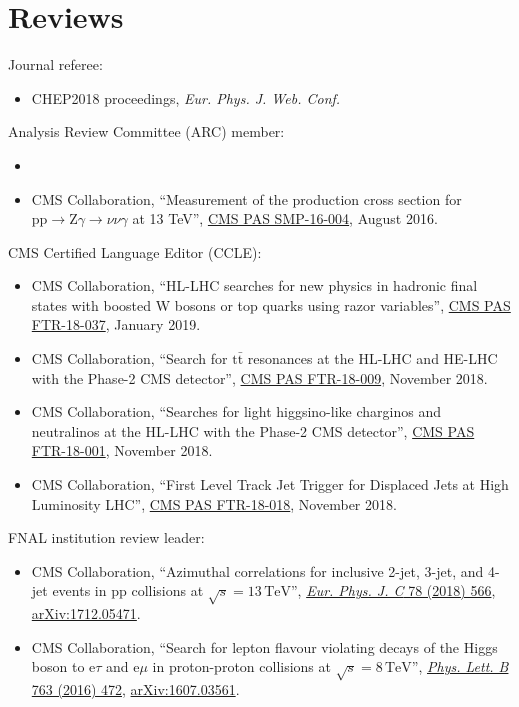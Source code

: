 \section{Reviews}
Journal referee:
\begin{itemize}[leftmargin=12pt]
\item CHEP2018 proceedings, \emph{Eur. Phys. J. Web. Conf.}
\end{itemize}
Analysis Review Committee (ARC) member:
\begin{itemize}[leftmargin=12pt]
\item {}
\item CMS Collaboration, ``Measurement of the production cross section for $\text{p}\text{p} \to \text{Z}\gamma \to \nu\nu\gamma$ at 13 TeV'', \href{https://cds.cern.ch/record/2204922}{CMS PAS SMP-16-004}, August 2016.
\end{itemize}
CMS Certified Language Editor (CCLE):
\begin{itemize}[leftmargin=12pt]
\item CMS Collaboration, ``HL-LHC searches for new physics in hadronic final states with boosted W bosons or top quarks using razor variables'', \href{https://cds.cern.ch/record/2658262}{CMS PAS FTR-18-037}, January 2019.
\item CMS Collaboration, ``Search for $\text{t}\bar{\text{t}}$ resonances at the HL-LHC and HE-LHC with the Phase-2 CMS detector'', \href{https://cds.cern.ch/record/2649032}{CMS PAS FTR-18-009}, November 2018.
\item CMS Collaboration, ``Searches for light higgsino-like charginos and neutralinos at the HL-LHC with the Phase-2 CMS detector'', \href{https://cds.cern.ch/record/2648538}{CMS PAS FTR-18-001}, November 2018.
\item CMS Collaboration, ``First Level Track Jet Trigger for Displaced Jets at High Luminosity LHC'', \href{https://cds.cern.ch/record/2647987}{CMS PAS FTR-18-018}, November 2018.
\end{itemize}
FNAL institution review leader:
\begin{itemize}[leftmargin=12pt]
\item CMS Collaboration, ``Azimuthal correlations for inclusive 2-jet, 3-jet, and 4-jet events in pp collisions at $\sqrt{s} = 13\,\text{TeV}$'', \href{http://dx.doi.org/10.1140/epjc/s10052-018-6033-4}{\emph{Eur. Phys. J. C} 78 (2018) 566}, \href{http://arxiv.org/abs/1712.05471}{arXiv:1712.05471}.
\item CMS Collaboration, ``Search for lepton flavour violating decays of the Higgs boson to e$\tau$ and e$\mu$ in proton-proton collisions at $\sqrt{s} = 8\,\text{TeV}$'', \href{http://dx.doi.org/10.1016/j.physletb.2016.09.062}{\emph{Phys. Lett. B} 763 (2016) 472}, \href{http://arxiv.org/abs/1607.03561}{arXiv:1607.03561}.
\end{itemize}